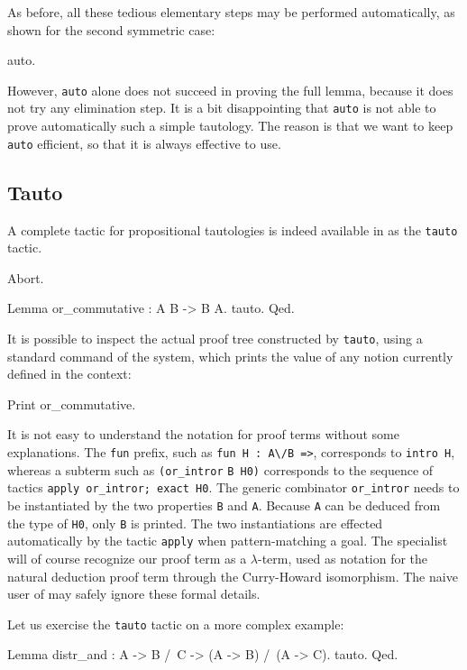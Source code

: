 \documentclass[11pt,a4paper]{book}
\begin{document}
As before, all these tedious elementary steps may be performed automatically,
as shown for the second symmetric case:

\begin{coq_example}
auto.
\end{coq_example}

However, \verb:auto: alone does not succeed in proving the full lemma, because
it does not try any elimination step.
It is a bit disappointing that \verb:auto: is not able to prove automatically 
such a simple tautology. The reason is that we want to keep
\verb:auto: efficient, so that it is always effective to use. 

\subsection{Tauto}

A complete tactic for propositional
tautologies is indeed available in \Coq{} as the \verb:tauto: tactic.
\begin{coq_eval}
Abort.
\end{coq_eval}
\begin{coq_example}
Lemma or_commutative : A \/ B -> B \/ A.
tauto.
Qed.
\end{coq_example}

It is possible to inspect the actual proof tree constructed by \verb:tauto:,
using a standard command of the system, which prints the value of any notion 
currently defined in the context:
\begin{coq_example}
Print or_commutative.
\end{coq_example}

It is not easy to understand the notation for proof terms without some
explanations. The \texttt{fun} prefix, such as \verb+fun H : A\/B =>+, 
corresponds
to \verb:intro H:, whereas a subterm such as 
\verb:(or_intror: \verb:B H0):
corresponds to the sequence of tactics \verb:apply or_intror; exact H0:. 
The generic combinator \verb:or_intror: needs to be instantiated by
the two properties \verb:B: and \verb:A:. Because \verb:A: can be
deduced from the type of \verb:H0:, only  \verb:B: is printed.
The two instantiations are effected automatically by the tactic
\verb:apply: when pattern-matching a goal. The specialist will of course
recognize our proof term as a $\lambda$-term, used as notation for the
natural deduction proof term through the Curry-Howard isomorphism. The
naive user of \Coq{} may safely ignore these formal details.

Let us exercise the \verb:tauto: tactic on a more complex example:
\begin{coq_example}
Lemma distr_and : A -> B /\ C -> (A -> B) /\ (A -> C).
tauto.
Qed.
\end{coq_example}
\end{document}
